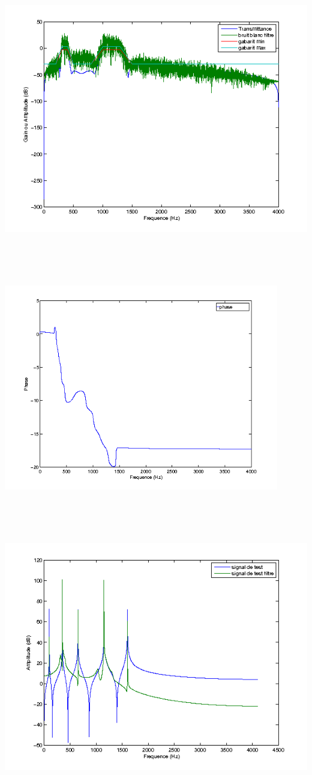 \documentclass{article}
\begin{document}
\inputminted[linenos,lastline=25]{matlab}{RII_ellip.m}
\includegraphics[height=13cm]{ell_1}
\inputminted[linenos,firstnumber=29,firstline=29,lastline=29]{matlab}{RII_ellip.m}
\includegraphics[height=9cm]{ell_2}
\inputminted[linenos,firstnumber=34,firstline=34,lastline=43]{matlab}{RII_ellip.m}
\includegraphics[height=13cm]{ell_3}
\end{document}
